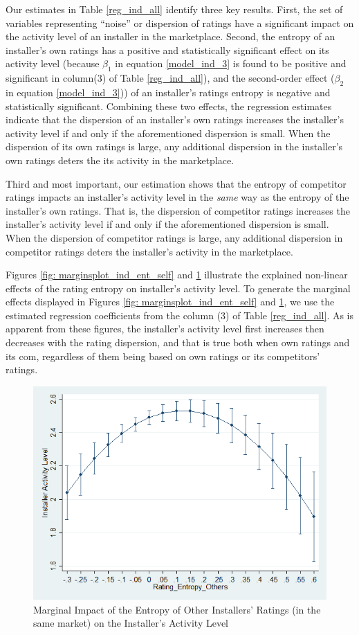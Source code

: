 \documentclass[msom,blindrev]{informs3}
\begin{document}
Our estimates in Table \ref{reg_ind_all} identify three key results. First, the set of variables representing ``noise'' or dispersion of ratings have a significant impact on the activity level of an installer in the marketplace. Second, the entropy of an installer's own ratings has a positive and statistically significant effect on its activity level (because $\beta_{1}$ in equation \eqref{model_ind_3} is found to be positive and significant in column(3) of Table \ref{reg_ind_all}), and the second-order effect ($\beta_{2}$ in equation \eqref{model_ind_3})) of an installer's ratings entropy is negative and statistically significant. Combining these two effects, the regression estimates indicate that the dispersion of an installer's own ratings increases the installer's activity level if and only if the aforementioned dispersion is small. When the dispersion of its own ratings is large, any additional dispersion in the installer's own ratings deters the its activity in the marketplace.

Third and most important, our estimation shows that the entropy of competitor ratings impacts an installer's activity level in the \emph{same} way as the entropy of the installer's own ratings. That is, the dispersion of competitor ratings increases the installer's activity level if and only if the aforementioned dispersion is small. When the dispersion of competitor ratings is large, any additional dispersion in competitor ratings deters the installer's activity in the marketplace.

Figures \ref{fig: marginsplot_ind_ent_self} and  \ref{fig: marginsplot_ind_ent_others} illustrate the explained non-linear effects of the rating entropy on installer's activity level. To generate the marginal effects displayed in Figures \ref{fig: marginsplot_ind_ent_self} and  \ref{fig: marginsplot_ind_ent_others}, we use the estimated regression coefficients from the column (3) of Table \ref{reg_ind_all}. As is apparent from these figures, the installer's activity level first increases then decreases with the rating dispersion, and that is true both when own ratings and its com, regardless of them being based on own ratings or its competitors' ratings.

\begin{figure}
	\centering
	\includegraphics[width=0.7\linewidth]{marginsplot_entothers.png}
	\caption{Marginal Impact of the Entropy of Other Installers' Ratings (in the same market) on the Installer's Activity Level}
	\label{fig: marginsplot_ind_ent_others}
\end{figure}
\end{document}
